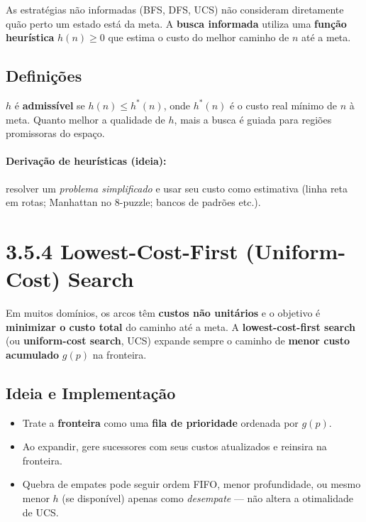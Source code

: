 \documentclass[9pt,a4paper]{extarticle}
\begin{document}
As estratégias não informadas (BFS, DFS, UCS) não consideram diretamente quão perto um estado está da meta.
A \textbf{busca informada} utiliza uma \textbf{função heurística} $h(n)\!\ge\!0$ que estima o custo do melhor caminho de $n$ até a meta.

\subsection*{Definições}
$h$ é \textbf{admissível} se $h(n)\le h^*(n)$, onde $h^*(n)$ é o custo real mínimo de $n$ à meta.
Quanto melhor a qualidade de $h$, mais a busca é guiada para regiões promissoras do espaço.

\paragraph{Derivação de heurísticas (ideia):} resolver um \emph{problema simplificado} e usar seu custo como estimativa (linha reta em rotas; Manhattan no 8-puzzle; bancos de padrões etc.).

\section{3.5.4 Lowest-Cost-First (Uniform-Cost) Search}

Em muitos domínios, os arcos têm \textbf{custos não unitários} e o objetivo é \textbf{minimizar o custo total} do caminho até a meta.
A \textbf{lowest-cost-first search} (ou \textbf{uniform-cost search}, UCS) expande sempre o caminho de \textbf{menor custo acumulado} $g(p)$ na fronteira.

\subsection*{Ideia e Implementação}
\begin{itemize}
  \item Trate a \textbf{fronteira} como uma \textbf{fila de prioridade} ordenada por $g(p)$.
  \item Ao expandir, gere sucessores com seus custos atualizados e reinsira na fronteira.
  \item Quebra de empates pode seguir ordem FIFO, menor profundidade, ou mesmo menor $h$ (se disponível) apenas como \emph{desempate} --- não altera a otimalidade de UCS.
\end{itemize}
\end{document}
